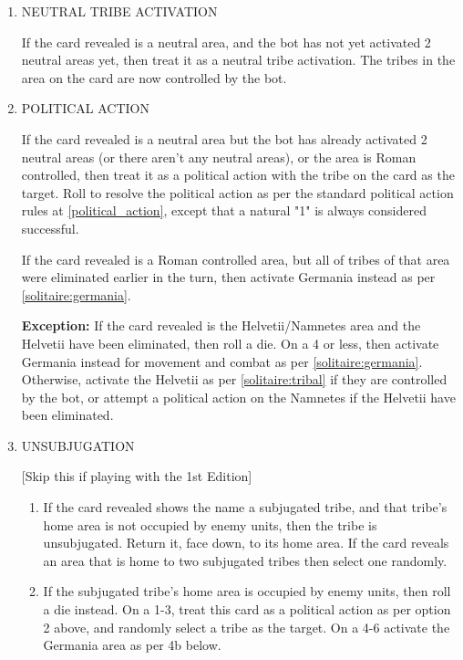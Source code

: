 \renewcommand{\labelenumii}{\alph{enumii}.}
\begin{enumerate}
  \item NEUTRAL TRIBE ACTIVATION

  If the card revealed is a neutral area, and the bot has not yet activated 2 neutral areas yet, then treat it as a neutral tribe activation. The tribes in the area on the card are now controlled by the bot.

  \item POLITICAL ACTION
  
  If the card revealed is a neutral area but the bot has already activated 2 neutral areas (or there aren't any neutral areas), or the area is Roman controlled, then treat it as a political action with the tribe on the card as the target. Roll to resolve the political action as per the standard political action rules at \ref{political_action}, except that a natural "1" is always considered successful.
  
  If the card revealed is a Roman controlled area, but all of tribes of that area were eliminated earlier in the turn, then activate Germania instead as per \ref{solitaire:germania}.
  
  \textbf{Exception:} If the card revealed is the Helvetii/Namnetes area and the Helvetii have been eliminated, then roll a die. On a 4 or less, then activate Germania instead for movement and combat as per \ref{solitaire:germania}. Otherwise, activate the Helvetii as per \ref{solitaire:tribal} if they are controlled by the bot, or attempt a political action on the Namnetes if the Helvetii have been eliminated.

  \item UNSUBJUGATION
  
  [Skip this if playing with the 1st Edition]
  
  \begin{enumerate}[leftmargin=0in]
    \item If the card revealed shows the name a subjugated tribe, and that tribe's home area is not occupied by enemy units, then the tribe is unsubjugated. Return it, face down, to its home area. If the card reveals an area that is home to two subjugated tribes then select one randomly.

    \item If the subjugated tribe's home area is occupied by enemy units, then roll a die instead. On a 1-3, treat this card as a political action as per option 2 above, and randomly select a tribe as the target. On a 4-6 activate the Germania area as per 4b below.
  \end{enumerate}
  

\end{enumerate}
